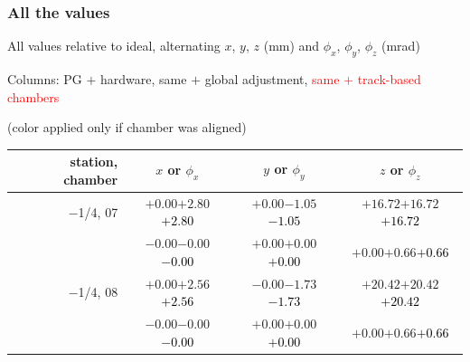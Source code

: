 \documentclass[compress]{beamer}
\begin{document}
\begin{frame}
\frametitle{All the values}
\tiny

All values relative to ideal, alternating $x$, $y$, $z$ (mm) and $\phi_x$, $\phi_y$, $\phi_z$ (mrad)

Columns: PG $+$ hardware, same $+$ global adjustment, \textcolor{red}{same $+$ track-based chambers}

\hfill (color applied only if chamber was aligned)

\vfill
\renewcommand{\arraystretch}{1.1}
\begin{tabular}{r | c | c | c}
station, chamber & $x$ or $\phi_x$ & $y$ or $\phi_y$ & $z$ or $\phi_z$ \\\hline
$-$1/4, 07 & $+0.00$\hspace{0.1 cm}$+2.80$\hspace{0.1 cm}\textcolor{black}{$+2.80$} & $+0.00$\hspace{0.1 cm}$-1.05$\hspace{0.1 cm}\textcolor{black}{$-1.05$} & $+16.72$\hspace{0.1 cm}$+16.72$\hspace{0.1 cm}\textcolor{black}{$+16.72$} \\
           & $-0.00$\hspace{0.1 cm}$-0.00$\hspace{0.1 cm}\textcolor{black}{$-0.00$} & $+0.00$\hspace{0.1 cm}$+0.00$\hspace{0.1 cm}\textcolor{black}{$+0.00$} & $+0.00$\hspace{0.1 cm}$+0.66$\hspace{0.1 cm}\textcolor{black}{$+0.66$} \\
$-$1/4, 08 & $+0.00$\hspace{0.1 cm}$+2.56$\hspace{0.1 cm}\textcolor{black}{$+2.56$} & $-0.00$\hspace{0.1 cm}$-1.73$\hspace{0.1 cm}\textcolor{black}{$-1.73$} & $+20.42$\hspace{0.1 cm}$+20.42$\hspace{0.1 cm}\textcolor{black}{$+20.42$} \\
           & $-0.00$\hspace{0.1 cm}$-0.00$\hspace{0.1 cm}\textcolor{black}{$-0.00$} & $+0.00$\hspace{0.1 cm}$+0.00$\hspace{0.1 cm}\textcolor{black}{$+0.00$} & $+0.00$\hspace{0.1 cm}$+0.66$\hspace{0.1 cm}\textcolor{black}{$+0.66$} \\

\end{tabular}
\end{frame}
\end{document}
